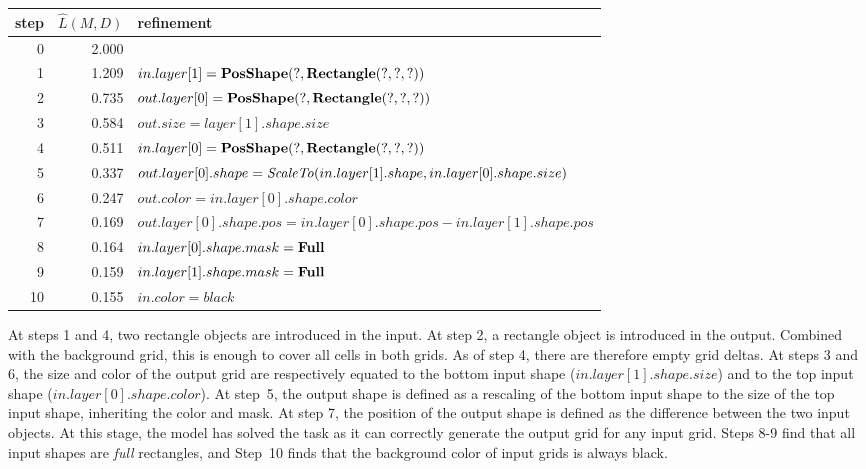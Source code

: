 \documentclass[a4paper]{llncs}
\begin{document}
\begin{center}
  \begin{tabular}{|r|r|l|}
    \hline
    step & $\hat{L}(M,D)$ & refinement \\
    \hline
    0 & 2.000 & \\
    1 & 1.209 & $in.layer[1] = {\bf PosShape}(?, {\bf Rectangle}(?,?,?))$ \\
    2 & 0.735 & $out.layer[0] = {\bf PosShape}(?, {\bf Rectangle}(?,?,?))$ \\
    3 & 0.584 & $out.size = layer[1].shape.size$ \\
    4 & 0.511 & $in.layer[0] = {\bf PosShape}(?, {\bf Rectangle}(?,?,?))$ \\
    5 & 0.337 & $out.layer[0].shape = {\it ScaleTo}(in.layer[1].shape, in.layer[0].shape.size)$ \\
    6 & 0.247 & $out.color = in.layer[0].shape.color$ \\
    7 & 0.169 & $out.layer[0].shape.pos = in.layer[0].shape.pos - in.layer[1].shape.pos$ \\    
    8 & 0.164 & $in.layer[0].shape.mask = {\bf Full}$ \\
    9 & 0.159 & $in.layer[1].shape.mask = {\bf Full}$ \\
    10 & 0.155 & $in.color = black$ \\
    \hline
  \end{tabular}
\end{center}

At steps 1 and 4, two rectangle objects are introduced in the input.
At step 2, a rectangle object is introduced in the output. Combined
with the background grid, this is enough to cover all cells in both
grids. As of step 4, there are therefore empty grid deltas.
%
At steps 3 and 6, the size and color of the output grid are
respectively equated to the bottom input shape
($in.layer[1].shape.size$) and to the top input shape
($in.layer[0].shape.color$). At step~5, the output shape is defined as
a rescaling of the bottom input shape to the size of the top input
shape, inheriting the color and mask. At step 7, the position of the
output shape is defined as the difference between the two input
objects.
%
At this stage, the model has solved the task as it can correctly
generate the output grid for any input grid.
%
Steps 8-9 find that all input shapes are {\em full} rectangles, and
Step~10 finds that the background color of input grids is always
black.
\end{document}
